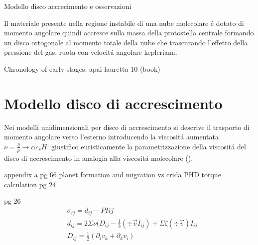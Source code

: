 \begin{reworking}{Modello disco accrecimento e osservazioni}
	
	Il materiale presente nella regione instabile di una nube molecolare \'e dotato di momento angolare quindi accresce sulla massa della protostella centrale formando un disco ortogonale al momento totale della nube che trascurando l'effetto della pressione del gas, ruota con velocit\'a angolare kepleriana.
	
	\begin{workout}
		Chronology of  early stages: apai lauretta 10 (book)
	\end{workout}
	
	
	
	\section{Modello disco di accrescimento}
	Nei modelli unidimensionali per disco di accrescimento si descrive il trasporto di momento angolare verso l'esterno introducendo la viscosit\'a aumentata $\nu=\frac{\eta}{\rho}\to\alpha c_s H$: giustifico euristicamente la parametrizzazione della viscosit\'a del disco di accrescimento in analogia alla viscosit\'a molecolare (\cite{bouvier2002theory}).
	
	\begin{workout}
		appendix a pg 66 planet formation and migration vs crida PHD torque calculation pg 24
	\end{workout}
	\begin{workout}
		pg 26
		\begin{align}
		&\sigma_{ij}=d_{ij}-PI{ij}\\
		&d_{ij}=2\Sigma\nu(D_{ij}-\frac{1}{3}(\div{\vec{v}}I_{ij})+\Sigma\zeta(\div{\vec{v}})I_{ij}\\
		&D_{ij}=\frac{1}{2}(\partial_iv_k+\partial_kv_i)
		\end{align}
	\end{workout}
	

\end{reworking}
